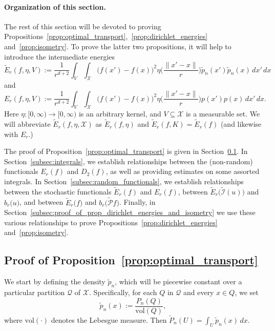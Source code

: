 \documentclass[twoside]{article}
\newcommand{\vol}{\text{vol}}
\newcommand{\1}{\mathbf{1}}
\newcommand{\Xset}{\mathcal{X}}
\newcommand{\mc}[1]{\mathcal{#1}}
\newcommand{\dx}{\,dx}
\newcommand{\wt}[1]{\widetilde{#1}}
\theoremstyle{definition}
\theoremstyle{remark}
\begin{document}
\paragraph{Organization of this section.}
The rest of this section will be devoted to proving Propositions~\ref{prop:optimal_transport},~\ref{prop:dirichlet_energies} and~\ref{prop:isometry}. To prove the latter two propositions, it will help to introduce the intermediate energies
\begin{equation*}
\wt{E}_r(f,\eta,V) := \frac{1}{r^{d + 2}}\int_{V} \int_{\Xset} \bigl(f(x') - f(x)\bigr)^2 \eta\biggl(\frac{\|x' - x\|}{r}\biggr) \wt{p}_n(x') \wt{p}_n(x) \,dx' \,dx
\end{equation*}
and
\begin{equation*}
{E}_r(f,\eta,V) := \frac{1}{r^{d + 2}}\int_{V} \int_{\Xset} \bigl(f(x') - f(x)\bigr)^2 \eta\biggl(\frac{\|x' - x\|}{r}\biggr) p(x') p(x) \,dx' \,dx.
\end{equation*}
Here $\eta: [0,\infty) \to [0,\infty)$ is an arbitrary kernel, and $V \subseteq \Xset$ is a measurable set. We will abbreviate $\wt{E}_r(f,\eta,\Xset)$ as $\wt{E}_r(f,\eta)$ and $\wt{E}_r(f,K) = \wt{E}_r(f)$ (and likewise with $E_r$.)

The proof of Proposition~\ref{prop:optimal_transport} is given in Section~\ref{subsec:proof_proposition_optimal_transport}. In Section~\ref{subsec:integrals}, we establish relationships between the (non-random) functionals $E_r(f)$ and $D_2(f)$, as well as providing estimates on some assorted integrals. In Section~\ref{subsec:random_functionals}, we establish relationships between the stochastic functionals $\wt{E}_r(f)$ and $E_r(f)$,  between $\wt{E}_r\bigl(\wt{\mc{I}}(u)\bigr)$ and $b_r\bigl(u\bigr)$, and between $\wt{E}_r\bigl(f\bigr)$ and $b_r\bigl(\wt{\mc{P}}f\bigr)$. Finally, in Section~\ref{subsec:proof_of_prop_dirichlet_energies_and_isometry} we use these various relationships to prove Propositions~\ref{prop:dirichlet_energies} and~\ref{prop:isometry}.

\subsection{Proof of Proposition~\ref{prop:optimal_transport}}
\label{subsec:proof_proposition_optimal_transport}

We start by defining the density $\wt{p}_n$, which will be piecewise constant over a particular partition $\mc{Q}$ of $\Xset$. Specifically, for each $Q$ in $\mc{Q}$ and every $x \in Q$, we set
\begin{equation}
\label{pf:prop_optimal_transport_0}
\wt{p}_n(x) := \frac{P_n(Q)}{\vol(Q)},
\end{equation}
where $\vol(\cdot)$ denotes the Lebesgue measure. Then $\wt{P}_n(U) = \int_{U} \wt{p}_n(x) \dx$.
\end{document}
